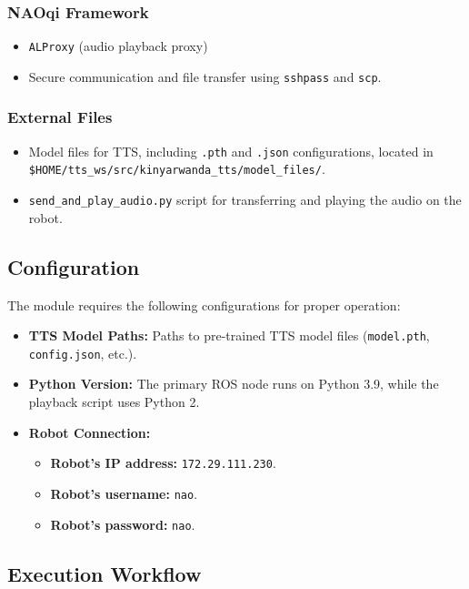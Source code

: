 \documentclass{CSSRforAfrica}
\begin{document}
\subsubsection{NAOqi Framework}
\begin{itemize}
    \item \texttt{ALProxy} (audio playback proxy)
    \item Secure communication and file transfer using \texttt{sshpass} and \texttt{scp}.
\end{itemize}

\subsubsection{External Files}
\begin{itemize}
    \item Model files for TTS, including \texttt{.pth} and \texttt{.json} configurations, located in\\ \texttt{\$HOME/tts\_ws/src/kinyarwanda\_tts/model\_files/}.
    \item \texttt{send\_and\_play\_audio.py} script for transferring and playing the audio on the robot.
\end{itemize}

\subsection{Configuration}

The module requires the following configurations for proper operation:
\begin{itemize}
    \item \textbf{TTS Model Paths:} Paths to pre-trained TTS model files (\texttt{model.pth}, \texttt{config.json}, etc.).
    \item \textbf{Python Version:} The primary ROS node runs on Python 3.9, while the playback script uses Python 2.
    \item \textbf{Robot Connection:}
    \begin{itemize}
        \item \textbf{Robot's IP address:} \texttt{172.29.111.230}.
        \item \textbf{Robot's username:} \texttt{nao}.
        \item \textbf{Robot's password:} \texttt{nao}.
    \end{itemize}
\end{itemize}

\subsection{Execution Workflow}
\end{document}
